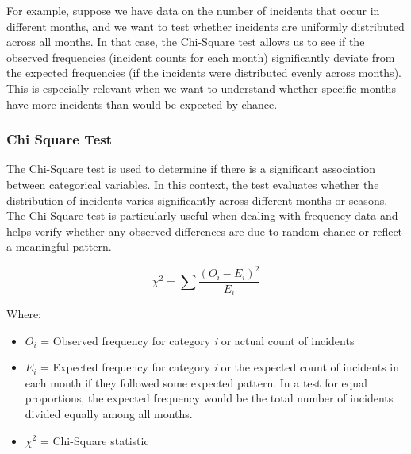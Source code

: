 \documentclass{article}
\begin{document}
For example, suppose we have data on the number of incidents that occur in different months, and we want to test whether incidents are uniformly distributed across all months. In that case, the Chi-Square test allows us to see if the observed frequencies (incident counts for each month) significantly deviate from the expected frequencies (if the incidents were distributed evenly across months). This is especially relevant when we want to understand whether specific months have more incidents than would be expected by chance.

\subsubsection{Chi Square Test}


The Chi-Square test is used to determine if there is a significant association between categorical variables. In this context, the test evaluates whether the distribution of incidents varies significantly across different months or seasons. The Chi-Square test is particularly useful when dealing with frequency data and helps verify whether any observed differences are due to random chance or reflect a meaningful pattern.

\begin{equation}
\chi^2 =  \sum \frac{(O_i - E_i)^2}{E_i}
\end{equation}

Where:
\begin{itemize}
    \item $O_i$ = Observed frequency for category \textit{i} or actual count of incidents
    \item $E_i$ = Expected frequency for category \textit{i} or the expected count of incidents in each month if they followed some expected pattern. In a test for equal proportions, the expected frequency would be the total number of incidents divided equally among all months.
    \item $\chi^2$ = Chi-Square statistic
\end{itemize}
\end{document}

